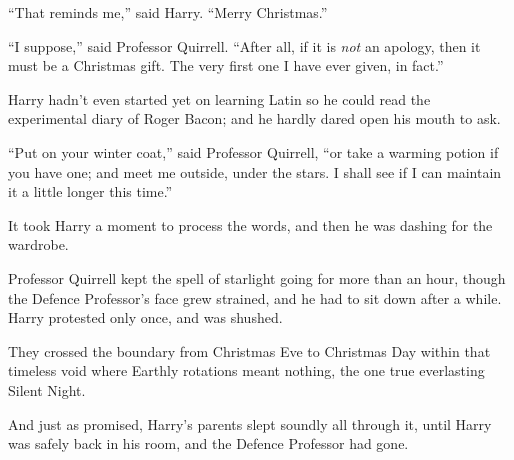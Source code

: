 “That reminds me,” said Harry.
“Merry Christmas.”

“I suppose,” said Professor Quirrell.
“After all, if it is \emph{not} an apology, then it must be a Christmas gift. The very first one I have ever given, in fact.”

Harry hadn’t even started yet on learning Latin so he could read the experimental diary of Roger Bacon; and he hardly dared open his mouth to ask.

“Put on your winter coat,” said Professor Quirrell, “or take a warming potion if you have one; and meet me outside, under the stars. I shall see if I can maintain it a little longer this time.”

It took Harry a moment to process the words, and then he was dashing for the wardrobe.

Professor Quirrell kept the spell of starlight going for more than an hour, though the Defence Professor’s face grew strained, and he had to sit down after a while. Harry protested only once, and was shushed.

They crossed the boundary from Christmas Eve to Christmas Day within that timeless void where Earthly rotations meant nothing, the one true everlasting Silent Night.

And just as promised, Harry’s parents slept soundly all through it, until Harry was safely back in his room, and the Defence Professor had gone.
